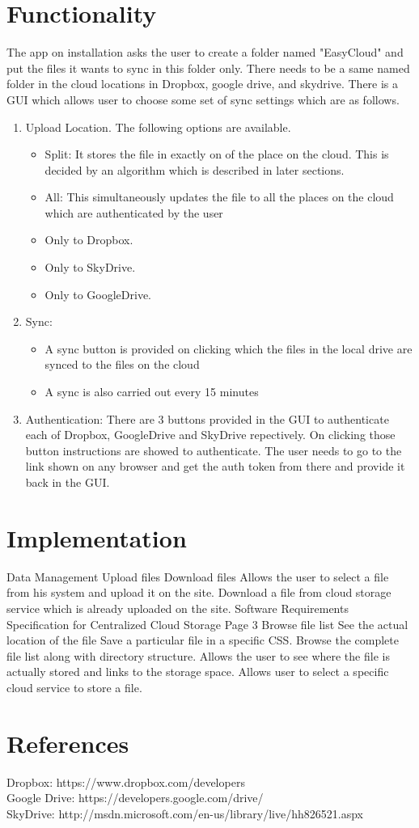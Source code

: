 \documentclass{article}
\begin{document}
\section{Functionality}
The app on installation asks the user to create a folder named "EasyCloud" and put the files it wants to sync in this folder only. There needs to be a same named folder in the cloud locations in Dropbox, google drive, and skydrive. There is a GUI which allows user to choose some set of sync settings which are as follows.
\begin{enumerate}
	\item Upload Location. The following options are available.
	\begin{itemize}
	\item Split: It stores the file in exactly on of the place on the cloud. This is decided by an algorithm which is described in later sections.
	\item All: This simultaneously updates the file to all the places on the cloud which are authenticated by the user
	\item Only to Dropbox.
	\item Only to SkyDrive.
	\item Only to GoogleDrive.
	\end{itemize}
	\item Sync:
	\begin{itemize}
	\item A sync button is provided on clicking which the files in the local drive are synced to the files on the cloud
	\item A sync is also carried out every 15 minutes 	
	\end{itemize}
	\item Authentication: There are 3 buttons provided in the GUI to authenticate each of Dropbox, GoogleDrive and SkyDrive repectively. On clicking those button instructions are showed to authenticate. The user needs to go to the link shown on any browser and get the auth token from there and provide it back in the GUI.
\end{enumerate}

\section{Implementation}


Data Management
Upload files
Download files
Allows the user to select a file from his system and upload it on the site.
Download a file from cloud storage service which is already uploaded on the site.
Software Requirements Specification for Centralized Cloud Storage
 Page 3
Browse file list
See the actual location of the file
Save a particular file in a specific CSS.
Browse the complete file list
along with directory structure.
Allows the user to see where the
file is actually stored and links
to the storage space.
Allows user to select a specific
cloud service to store a file.


\section{References}
Dropbox: https://www.dropbox.com/developers \\
Google Drive: https://developers.google.com/drive/ \\
SkyDrive: http://msdn.microsoft.com/en-us/library/live/hh826521.aspx \\
\end{document}
